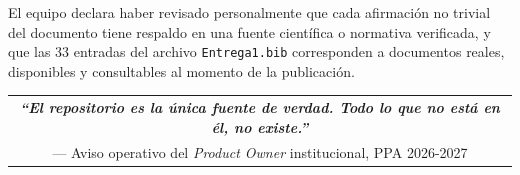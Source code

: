 \documentclass[11pt,a4paper,twoside]{report}
\begin{document}
El equipo declara haber revisado personalmente que cada afirmaci\'on no trivial del documento tiene respaldo en una fuente cient\'ifica o normativa verificada, y que las 33 entradas del archivo \texttt{Entrega1.bib} corresponden a documentos reales, disponibles y consultables al momento de la publicaci\'on.

\vspace{1em}

\begin{center}
    \begin{tabular}{c}
        \color{uteqverde}\bfseries\itshape ``El repositorio es la \'unica fuente de verdad. Todo lo que no est\'a en \'el, no existe.''\\[6pt]
        \color{grisTexto}\small --- Aviso operativo del \emph{Product Owner} institucional, PPA 2026-2027
    \end{tabular}
\end{center}



\end{document}
